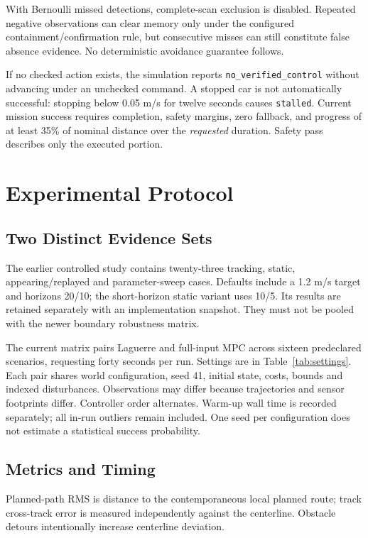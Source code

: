 \documentclass[conference]{IEEEtran}
\begin{document}
With Bernoulli missed detections, complete-scan exclusion is disabled.
Repeated negative observations can clear memory only under the configured
containment/confirmation rule, but consecutive misses can still constitute
false absence evidence. No deterministic avoidance guarantee follows.

If no checked action exists, the simulation reports
\texttt{no\_verified\_control} without advancing under an unchecked command.
A stopped car is not automatically successful: stopping below 0.05 m/s for
twelve seconds causes \texttt{stalled}. Current mission success requires
completion, safety margins, zero fallback, and progress of at least
35\% of nominal distance over the \emph{requested} duration.
Safety pass describes only the executed portion.

\section{Experimental Protocol}
\subsection{Two Distinct Evidence Sets}
The earlier controlled study contains twenty-three tracking, static,
appearing/replayed and parameter-sweep cases. Defaults include a 1.2 m/s
target and horizons 20/10; the short-horizon static variant uses 10/5.
Its results are retained separately with an implementation snapshot.
They must not be pooled with the newer boundary robustness matrix.

The current matrix pairs Laguerre and full-input MPC across sixteen
predeclared scenarios, requesting forty seconds per run. Settings are in
Table~\ref{tab:settings}. Each pair shares world configuration, seed 41,
initial state, costs, bounds and indexed disturbances. Observations may differ
because trajectories and sensor footprints differ. Controller order alternates.
Warm-up wall time is recorded separately; all in-run outliers remain included.
One seed per configuration does not estimate a statistical success probability.

\subsection{Metrics and Timing}
Planned-path RMS is distance to the contemporaneous local planned route;
track cross-track error is measured independently against the centerline.
Obstacle detours intentionally increase centerline deviation.
\end{document}
